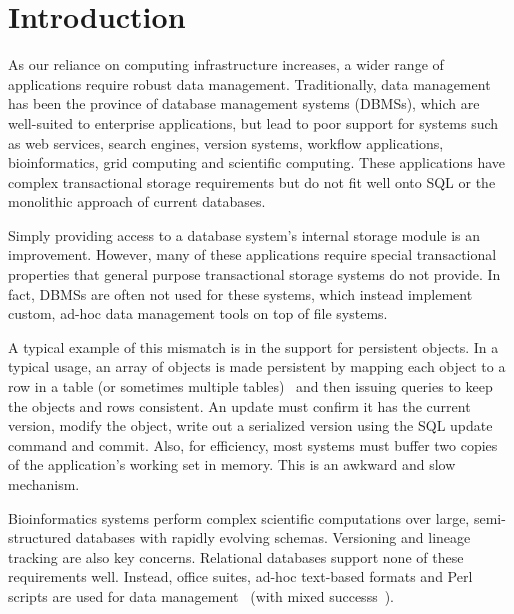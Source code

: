 \documentclass[letterpaper,twocolumn,10pt]{article}
\begin{document}




\section{Introduction}

As our reliance on computing infrastructure increases, a wider range of 
applications require robust data management.  Traditionally, data management
has been the province of database management systems (DBMSs), which are
well-suited to enterprise applications, but lead to poor support for
systems such as web services, search engines, version systems, workflow 
applications, bioinformatics, grid computing and scientific computing.  These 
applications have complex transactional storage requirements
but do not fit well
onto SQL or the monolithic approach of current databases.  

Simply providing
access to a database system's internal storage module is an improvement.
However, many of these applications require special transactional properties 
that general purpose transactional storage systems do not provide.  In
fact, DBMSs are often not used for these systems, which instead
implement custom, ad-hoc data management tools on top of file
systems.

A typical example of this mismatch is in the support for
persistent objects.
In a typical usage, an array of objects is made persistent by
mapping each object to a row in a table (or sometimes multiple
tables)~\cite{hibernate} and then issuing queries to keep the objects and
rows consistent. An update must confirm it has the current
version, modify the object, write out a serialized version using the
SQL update command and commit.  Also, for efficiency, most systems must 
buffer two copies of the application's working set in memory.  
This is an awkward and slow mechanism.

Bioinformatics systems perform complex scientific
computations over large, semi-structured databases with rapidly evolving schemas.  Versioning and
lineage tracking are also key concerns.  Relational databases support
none of these requirements well.  Instead, office suites, ad-hoc
text-based formats and Perl scripts are used for data management~\cite{perl} (with mixed successs~\cite{excel}).
\end{document}
